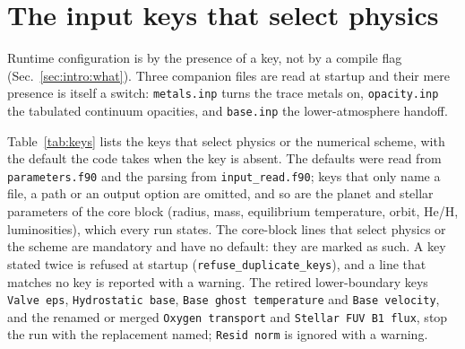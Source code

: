 \section{The input keys that select physics}
\label{sec:keys}

Runtime configuration is by the presence of a key, not by a compile flag
(Sec.~\ref{sec:intro:what}).  Three companion files are read at startup and
their mere presence is itself a switch:
\texttt{metals.inp} turns the trace metals on, \texttt{opacity.inp} the
tabulated continuum opacities, and \texttt{base.inp} the lower-atmosphere
handoff.

Table~\ref{tab:keys} lists the keys that select physics or the numerical
scheme, with the default the code takes when the key is absent.  The defaults
were read from \texttt{parameters.f90} and the parsing from
\texttt{input\_read.f90}; keys that only name a file, a path or an output
option are omitted, and so are the planet and stellar parameters of the core
block (radius, mass, equilibrium temperature, orbit, He/H, luminosities),
which every run states.  The core-block lines that select physics or the
scheme are mandatory and have no default: they are marked as such.  A key
stated twice is refused at startup (\texttt{refuse\_duplicate\_keys}), and a
line that matches no key is reported with a warning.  The retired
lower-boundary keys \texttt{Valve eps}, \texttt{Hydrostatic base},
\texttt{Base ghost temperature} and \texttt{Base velocity}, and the renamed
or merged \texttt{Oxygen transport} and \texttt{Stellar FUV B1 flux}, stop the
run with the replacement named; \texttt{Resid norm} is ignored with a
warning.

